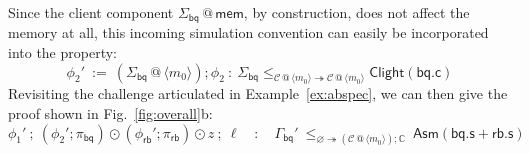 \documentclass[acmsmall,screen,review,anonymous]{acmart}
\newcommand{\kw}[1]{\ensuremath{ \mathsf{#1} }}
\begin{document}
\begin{example}
Since the client component
$\Sigma_\kw{bq} \mathbin@ \kw{mem}$,
by construction,
does not affect the memory at all,
this incoming simulation convention
can easily be incorporated into the property:
\[
  \phi_2' \: := \:
    (\Sigma_\kw{bq} \mathbin@ \langle m_0 \rangle)
    \mathbin;
    \phi_2
  \: : \:
  \Sigma_\kw{bq}
    \le_{\mathcal{C} \mathbin@ \langle m_0 \rangle
         \twoheadrightarrow
         \mathcal{C} \mathbin@ \langle m_0 \rangle}
    \kw{Clight}(\kw{bq.c})
\]
Revisiting the challenge articulated in Example~\ref{ex:abspec},
we can then give the proof shown in Fig.~\ref{fig:overall}b:
\[
  \phi_1'
  \:\mathbin;\:
  (\phi_2' \mathbin; \pi_\kw{bq}) \odot
  (\phi_\kw{rb}' \mathbin; \pi_\kw{rb}) \odot z
  \:\mathbin;\:
  \ell
  \quad : \quad
  \Gamma_\kw{bq}'
  \:
  \le_{\varnothing \twoheadrightarrow
       (\mathcal{C} \mathbin@ \langle m_0 \rangle) \mathbin; \mathbb{C}}
  \:
  \kw{Asm}(\kw{bq.s} + \kw{rb.s})
\]
\end{example}
\end{document}
